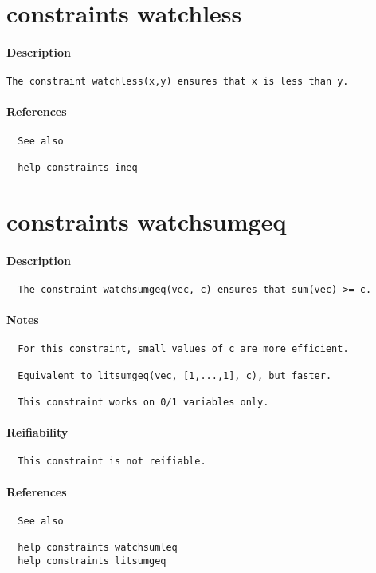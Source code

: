 \section{constraints watchless}
\paragraph{Description}
{\footnotesize
\begin{verbatim}
The constraint watchless(x,y) ensures that x is less than y.
\end{verbatim}
}
\paragraph{References}
{\footnotesize
\begin{verbatim}
  See also

  help constraints ineq
\end{verbatim}
}
\section{constraints watchsumgeq}
\paragraph{Description}
{\footnotesize
\begin{verbatim}
  The constraint watchsumgeq(vec, c) ensures that sum(vec) >= c.
\end{verbatim}
}
\paragraph{Notes}
{\footnotesize
\begin{verbatim}
  For this constraint, small values of c are more efficient.

  Equivalent to litsumgeq(vec, [1,...,1], c), but faster.

  This constraint works on 0/1 variables only.
\end{verbatim}
}
\paragraph{Reifiability}
{\footnotesize
\begin{verbatim}
  This constraint is not reifiable.
\end{verbatim}
}
\paragraph{References}
{\footnotesize
\begin{verbatim}
  See also

  help constraints watchsumleq
  help constraints litsumgeq
\end{verbatim}
}
